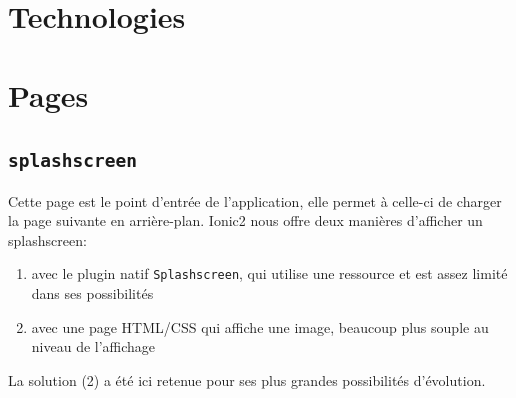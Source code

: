 \documentclass[french]{article}
\begin{document}
	\section{Technologies}
		
	\section{Pages}
		
		\subsection{\texttt{splashscreen}}
			Cette page est le point d'entrée de l'application, elle permet à celle-ci de charger la page suivante en arrière-plan. Ionic2 nous offre deux manières d'afficher un splashscreen:
			\begin{enumerate}
				\item avec le plugin natif \texttt{Splashscreen}, qui utilise une ressource et est assez limité dans ses possibilités
				\item avec une page HTML/CSS qui affiche une image, beaucoup plus souple au niveau de l'affichage
			\end{enumerate}
			La solution (2) a été ici retenue pour ses plus grandes possibilités d'évolution.
		
			
\end{document}
